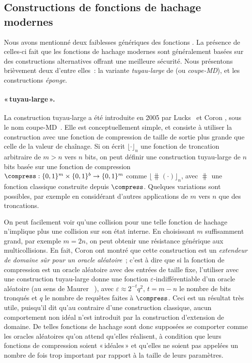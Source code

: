 \subsection{Constructions de fonctions de hachage modernes}
\label{sec:fbetter}

Nous avons mentionné deux faiblesses génériques des fonctions \merkdam. La présence de celles-ci fait que les fonctions de hachage modernes sont généralement
basées sur des constructions alternatives offrant une meilleure sécurité. Nous présentons brièvement deux d'entre elles~: la
variante \emph{tuyau-large} de \merkdam (ou \emph{coupe-MD}), et les constructions \emph{éponge}.


\paragraph{\merkdam «\,tuyau-large\,».}
La construction tuyau-large a été introduite en 2005 par Lucks~\cite{DBLP:conf/asiacrypt/Lucks05}
et Coron \etal, sous le nom coupe-MD~\cite{DBLP:conf/crypto/CoronDMP05}.
Elle est conceptuellement simple, et consiste à utiliser la construction \merkdam avec une fonction de compression de taille de sortie plus grande que celle de la valeur de chaînage.
Si on écrit
$\lfloor\cdot\rfloor_n$
une fonction de troncation arbitraire de $m > n$ vers $n$ bits, on peut définir
une construction tuyau-large de $n$ bits basée sur une fonction de compression $\compress : \{0,1\}^m \times \{0,1\}^b \rightarrow \{0,1\}^m$
comme $\lfloor\hash(\cdot)\rfloor_n$, avec $\hash$ une fonction \merkdam classique construite depuis $\compress$.
Quelques variations sont possibles, par exemple en considérant d'autres applications de $m$ vers $n$ que des troncations.

On peut facilement voir qu'une collision pour une telle fonction de hachage n'implique plus une collision sur son état interne.
En choisissant $m$ suffisamment grand, par exemple $m = 2n$,
on peut obtenir une résistance générique aux multicollisions. En fait,
Coron \etal ont montré que cette construction est un \emph{extendeur de domaine sûr pour un oracle aléatoire}~; c'est à dire
que si la fonction de compression est un oracle aléatoire avec des entrées de taille fixe, l'utiliser avec une construction tuyau-large donne une fonction
$\varepsilon$-indifférentiable d'un oracle aléatoire
(au sens de Maurer \etal~\cite{DBLP:conf/tcc/MaurerRH04}), avec
$\varepsilon \approx 2^{-t}q^2$, $t = m - n$ le nombre de bits tronqués et $q$ le nombre de requêtes faites à $\compress$.
Ceci est un résultat très utile, puisqu'il dit qu'au contraire d'une construction \merkdam classique, aucun comportement non idéal
n'est introduit par la construction d'extension de domaine. De telles fonctions de hachage sont donc supposées se comporter comme les oracles aléatoires
qu'on attend qu'elles réalisent, à condition que leurs fonctions de compression soient «\,idéales\,» et qu'elles ne soient
pas appelées un nombre de fois trop important par rapport à la taille de leurs paramètres.


